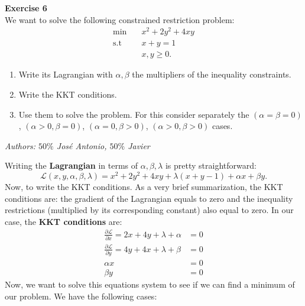 \documentclass[11pt,table]{article}
\newenvironment{problem}[2][Exercise]
{ \begin{mdframed}[backgroundcolor=gray!20] \textbf{#1 #2} \\}
	{\hspace{0.0cm}\newline\newline \emph{Authors: \(50\%\) José Antonio, \(50\%\) Javier}  \end{mdframed}}
\begin{document}
	\begin{problem}{6}
		We want to solve the following constrained restriction problem:
		\begin{align*}
			\min \quad       & x^{2} + 2y^{2} + 4xy \\
			\text{s.t} \quad & x + y = 1            \\
			& x,y \geq 0.
		\end{align*}
		\begin{enumerate}
			\item Write its Lagrangian with \(\alpha,\beta\) the multipliers of the inequality constraints.
			\item Write the KKT conditions.
			\item Use them to solve the problem. For this consider separately the \((\alpha = \beta = 0)\), \((\alpha > 0, \beta = 0)\), \((\alpha = 0, \beta > 0)\), \((\alpha > 0, \beta > 0)\) cases.
		\end{enumerate}
	\end{problem}
	
	Writing the \textbf{Lagrangian} in terms of \(\alpha,\beta,\lambda\) is pretty straightforward:
	\[
	\mathcal L(x,y,\alpha,\beta,\lambda) = x^{2} + 2y^{2} + 4xy + \lambda(x+y - 1) + \alpha x + \beta y .
	\]
	Now, to write the KKT conditions. As a very brief summarization, the KKT conditions are: the gradient of the Lagrangian equals to zero and the inequality restrictions (multiplied by its corresponding constant) also equal to zero. In our case, the \textbf{KKT conditions} are:
	\begin{align*}
		\frac{\partial \mathcal L}{\partial x}  = 2x + 4y + \lambda + \alpha & = 0 \\
		\frac{\partial \mathcal L}{\partial y}  = 4y + 4x + \lambda + \beta  & = 0 \\
		\alpha x                                                             & = 0 \\
		\beta y                                                              & = 0
	\end{align*}
	Now, we want to solve this equations system to see if we can find a minimum of our problem. We have the following cases:
	
\end{document}
